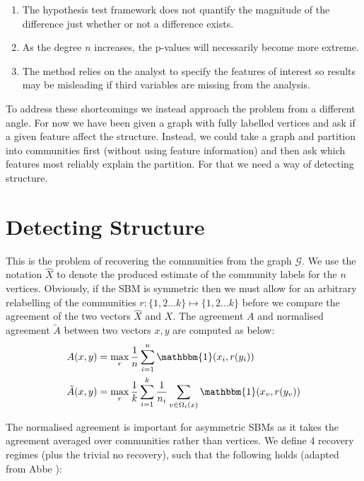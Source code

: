 \documentclass[]{article}
\newcommand{\Gcal}{\mathcal{G}}
\newcommand{\one}{\mathbbm{1}}
\begin{document}
\begin{enumerate}
	\item The hypothesis test framework does not quantify the magnitude of the difference just whether or not a difference exists.
	\item As the degree $n$ increases, the p-values will necessarily become more extreme.
	\item The method relies on the analyst to specify the features of interest so results may be misleading if third variables are missing from the analysis.
\end{enumerate} 

To address these shortcomings we instead approach the problem from a different angle. For now we have been given a graph with fully labelled vertices and ask if a given feature affect the structure. Instead, we could take a graph and partition into communities first (without using feature information) and then ask which features most reliably explain the partition. For that we need a way of detecting structure.

\section{Detecting Structure}

This is the problem of recovering the communities from the graph $\Gcal$. We use the notation $\hat{X}$ to denote the produced estimate of the community labels for the $n$ vertices. Obviously, if the SBM is symmetric then we must allow for an arbitrary relabelling of the communities $r: \{1, 2 \dots k\} \mapsto \{1, 2 \dots k\}$ before we compare the agreement of the two vectors $\hat{X}$ and $X$. The agreement $A$ and normalised agreement $\tilde{A}$ between two vectors $x, y$ are computed as below:
%
\begin{align}
	A(x, y) &= \max_r \frac{1}{n} \sum_{i=1}^{n} \one (x_i, r(y_i)) \\
	\tilde{A}(x, y) &= \max_r \frac{1}{k} \sum_{i=1}^{k} \frac{1}{n_i} \sum_{v \in \Omega_i(x)} \one(x_v, r(y_v))
\end{align}

The normalised agreement is important for asymmetric SBMs as it takes the agreement averaged over communities rather than vertices. We define 4 recovery regimes (plus the trivial no recovery), such that the following holds (adapted from Abbe \cite{Abbe}):
\end{document}

